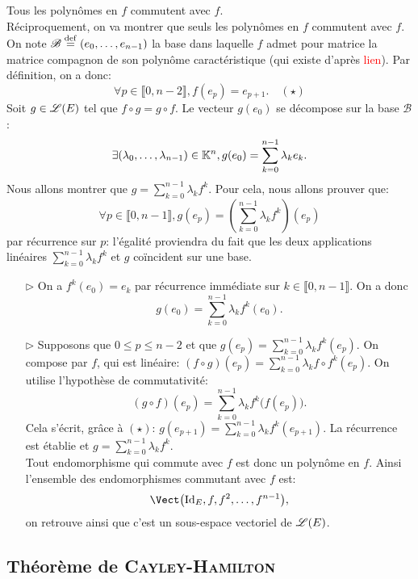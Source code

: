\begin{preuve}
    Tous les polynômes en $f$ commutent avec $f$. \\
    Réciproquement, on va montrer que seuls les polynômes en $f$ commutent avec $f$. On note $\mathscr{B} \overset{\mathrm{\tiny def}}{=} (e_0, \dots, e_{n-1})$ la base dans laquelle $f$ admet pour matrice la matrice compagnon de son polynôme caractéristique (qui existe d'après \textcolor{red}{lien}). Par définition, on a donc:
    $$\forall p \in \llbracket 0, n-2 \rrbracket, f(e_p) = e_{p+1}. \quad (\star)$$
    Soit $g \in \mathscr{L}(E)$ tel que $f \circ g = g \circ f$. Le vecteur $g(e_0)$ se décompose sur la base $\mathscr{B}$:
    $$\exists (\lambda_0, \dots, \lambda_{n-1}) \in \mathbb{K}^n, g(e_0) = \sum_{k=0}^{n-1} \lambda_k e_k.$$
    Nous allons montrer que $g = \sum\limits_{k=0}^{n-1} \lambda_k f^k$. Pour cela, nous allons prouver que:
    $$\forall p \in \llbracket 0, n-1 \rrbracket, g(e_p) = \left( \sum_{k=0}^{n-1} \lambda_k f^k \right)(e_p)$$
    par récurrence sur $p$: l'égalité proviendra du fait que les deux applications linéaires $\sum\limits_{k=0}^{n-1} \lambda_k f^k$ et $g$ coïncident sur une base. 
    \begin{itemize}
        \item[$\rhd$] On a $f^k (e_0) = e_k$ par récurrence immédiate sur $k \in \llbracket 0, n-1 \rrbracket$. On a donc
        $$g(e_0) = \sum_{k=0}^{n-1} \lambda_k f^k(e_0).$$
        \item[$\rhd$] Supposons que $0 \leqslant p \leqslant n-2$ et que $g(e_p) = \sum\limits_{k=0}^{n-1} \lambda_k f^k (e_p)$. On compose par $f$, qui est linéaire: $(f \circ g)(e_p) = \sum\limits_{k=0}^{n-1} \lambda_k f \circ f^k (e_p)$. On utilise l'hypothèse de commutativité:
        $$(g \circ f)(e_p) = \sum_{k=0}^{n-1} \lambda_k f^k \big( f(e_p) \big).$$
        Cela s'écrit, grâce à $(\star)$: $g(e_{p+1}) = \sum\limits_{k=0}^{n-1} \lambda_k f^k(e_{p+1})$. La récurrence est établie et $g = \sum\limits_{k=0}^{n-1} \lambda_k f^k$. \\
        Tout endomorphisme qui commute avec $f$ est donc un polynôme en $f$. Ainsi l'ensemble des endomorphismes commutant avec $f$ est:
        $$\Vect \big( \Id_E, f, f^2, \dots, f^{n-1}\big),$$
        on retrouve ainsi que c'est un sous-espace vectoriel de $\mathscr{L}(E)$.
    \end{itemize}
\end{preuve}

\subsection{Théorème de \textsc{Cayley}-\textsc{Hamilton}}

